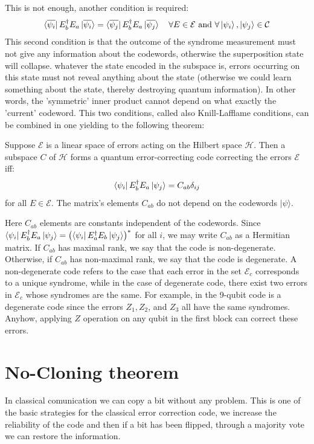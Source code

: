 This is not enough, another condition is required:
\begin{equation*}
    \bra{\overline{\psi_i}}E_b^{\dagger}E_a\ket{\overline{\psi_i}} = \bra{\overline{\psi_j}}E_b^{\dagger}E_a\ket{\overline{\psi_j}} \quad \forall E \in \mathcal{E} \text{   and   } \forall \ket{\psi_i},\ket{\psi_j} \in \mathcal{C}
\end{equation*}
This second condition is that the outcome of the syndrome measurement must not give any information about the codewords, otherwise the superposition state will collapse. 
whatever the state encoded in the subspace is, errors occurring on this state must not reveal anything about the state (otherwise we could learn something about the state, thereby destroying quantum information). In other words, the 'symmetric' inner product cannot depend on what exactly the 'current' codeword.
This two conditions, called also Knill-Lafflame conditions, can be combined in one yielding to the following theorem: 
 \begin{theorem}
 Suppose $\mathcal{E}$ is a linear space of errors acting on the Hilbert space
$\mathcal{H}$. Then a subspace $C$ of $\mathcal{H}$ forms a quantum error-correcting code correcting the errors $\mathcal{E}$ iff:
\begin{equation}
\bra{\psi_i}E_b^{\dagger}E_a\ket{\psi_j} = C_{a b}\delta_{ij}
\end{equation}
for all $E \in \mathcal{E}$. The matrix's elements $C_{a b}$ do not depend on the codewords $|\psi\rangle$.
\end{theorem}

Here $C_{a b}$ elements are constants independent of the codewords. Since $\bra{\psi_i}E_b^{\dagger}E_a\ket{\psi_j}=\left(\bra{\psi_i}E_a^{\dagger}E_b\ket{\psi_j}\right)^{*}$ for all $i$, we may write $C_{a b}$ as a Hermitian matrix.
If $C_{a b}$ has maximal rank, we say that the code is non-degenerate. Otherwise, if $C_{a b}$ has non-maximal rank, we say that the code is degenerate. A non-degenerate code refers to the case that each error in the set $\mathcal{E}_{c}$ corresponds to a unique syndrome, while in the case of degenerate code, there exist two errors in $\mathcal{E}_{c}$ whose syndromes are the same. For example, in the 9-qubit code is a degenerate code since the errors $Z_{1}, Z_{2}$, and $Z_{3}$ all have the same syndromes. Anyhow, applying $Z$ operation on any qubit in the first block can correct these errors.

\section{No-Cloning theorem}
In classical comunication we can copy a bit without any problem. This is one of the basic strategies for the classical error correction code, we increase the reliability of the code and then if a bit has been flipped, through a majority vote we can restore the information.  

